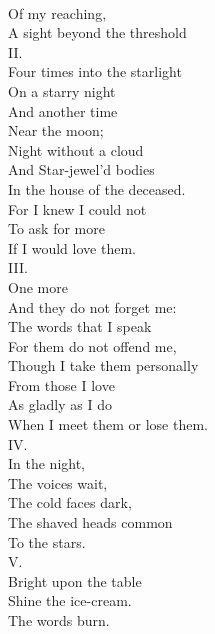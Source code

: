 \documentclass[smalldemyvopaper,11pt,twoside,onecolumn,openright,extrafontsizes]{memoir}
\begin{document}
\\Of my reaching,
\\A sight beyond the threshold
\\II.
\\Four times into the starlight
\\On a starry night
\\And another time
\\Near the moon;
\\Night without a cloud
\\And Star-jewel'd bodies
\\In the house of the deceased.
\\For I knew I could not
\\To ask for more
\\If I would love them.
\\III.
\\One more
\\And they do not forget me:
\\The words that I speak
\\For them do not offend me,
\\Though I take them personally
\\From those I love
\\As gladly as I do
\\When I meet them or lose them.
\\IV.
\\In the night,
\\The voices wait,
\\The cold faces dark,
\\The shaved heads common
\\To the stars.
\\V.
\\Bright upon the table
\\Shine the ice-cream.
\\The words burn.
\end{document}

